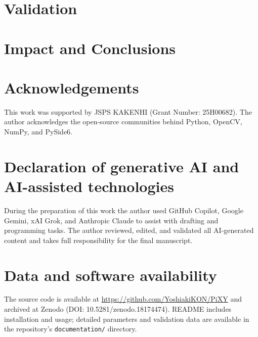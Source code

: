 \documentclass[11pt]{article}
\begin{document}
\section{Validation}
\section{Impact and Conclusions}
\section*{Acknowledgements}
This work was supported by JSPS KAKENHI (Grant Number: 25H00682). The author acknowledges the open-source communities behind Python, OpenCV, NumPy, and PySide6.
\section*{Declaration of generative AI and AI-assisted technologies}
During the preparation of this work the author used GitHub Copilot, Google Gemini, xAI Grok, and Anthropic Claude to assist with drafting and programming tasks. The author reviewed, edited, and validated all AI-generated content and takes full responsibility for the final manuscript.
\section*{Data and software availability}
The source code is available at \url{https://github.com/YoshiakiKON/PiXY} and archived at Zenodo (DOI: 10.5281/zenodo.18174474). README includes installation and usage; detailed parameters and validation data are available in the repository's \texttt{documentation/} directory.
\end{document}
